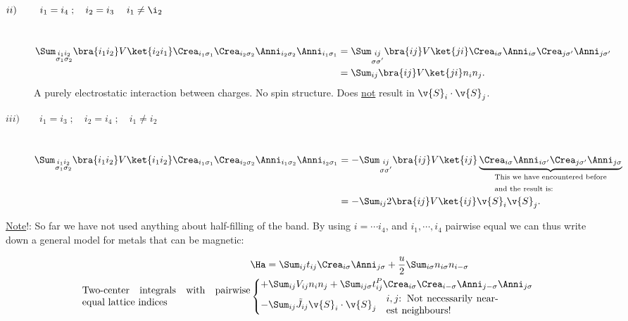 \begin{description}
\item[$ii)\phantom{i}\quad\quad i_1=i_4\;;\quad i_2=i_3\;\quad i_1\neq\i_2$]\hfill \\
  \[
	\begin{aligned}
	\Sum_{\substack{i_1i_2\\\sigma_1\sigma_2}}\bra{i_1i_2}V\ket{i_2i_1}\Crea_{i_1\sigma_1}\Crea_{i_2\sigma_2}\Anni_{i_2\sigma_2}\Anni_{i_1\sigma_1}
  &= \Sum_{\substack{ij\\\sigma\sigma'}} \bra{ij}V\ket{ji}\Crea_{i\sigma}\Anni_{i\sigma}\Crea_{j\sigma'}\Anni_{j\sigma'}\\
  &= \Sum_{ij}\bra{ij}V\ket{ji}n_in_j.
	\end{aligned}
  \]
  A purely electrostatic interaction between charges. No spin structure. Does \underline{not} result in $\v{S}_i\cdot\v{S}_j$.
\item[$iii)\quad\quad i_1=i_3\;;\quad i_2=i_4\;;\quad i_1\neq i_2$]\hfill \\
  \[
	\begin{aligned}
	  \Sum_{\substack{i_1i_2\\\sigma_1\sigma_2}}\bra{i_1i_2}V\ket{i_1i_2}\Crea_{i_1\sigma_1}\Crea_{i_2\sigma_2}\Anni_{i_1\sigma_2}\Anni_{i_2\sigma_1}
	  &= -\Sum_{\substack{ij\\\sigma\sigma'}}\bra{ij}V\ket{ij}\underbrace{\Crea_{i\sigma}\Anni_{i\sigma'}\Crea_{j\sigma'}\Anni_{j\sigma}}_\text{\parbox{4cm}
	  {This we have encountered before
	  and the result is:}}\\
	  &= -\Sum_{ij}2\bra{ij}V\ket{ij}\v{S}_i\v{S}_j.
	\end{aligned}
  \]
\end{description}

\underline{Note}!: So far we have not used anything about half-filling of the band. By using $i=\cdots i_4$, and $i_1,\cdots,i_4$ pairwise equal we can thus write down a general
model for metals that can be magnetic:

\[
  \begin{aligned}
	&\Ha = \Sum_{ij}t_{ij}\Crea_{i\sigma}\Anni_{j\sigma} + \frac{u}{2}\Sum_{i\sigma}n_{i\sigma}n_{i-\sigma}\\
	\text{\parbox{6cm}{Two-center integrals with pairwise equal lattice indices}} &\left\{
	  \begin{aligned}
		+ & \Sum_{ij}V_{ij}n_in_j + \Sum_{ij\sigma}t_{ij}^P\Crea_{i\sigma}\Crea_{i-\sigma}\Anni_{j-\sigma}\Anni_{j\sigma}\\
		- & \Sum_{ij}\tilde{J}_{ij}\v{S}_i\cdot\v{S}_j\quad\text{\parbox{4cm}{$i,j$: Not necessarily nearest neighbours!}}
	  \end{aligned}
	  \right.
  \end{aligned}
\]

